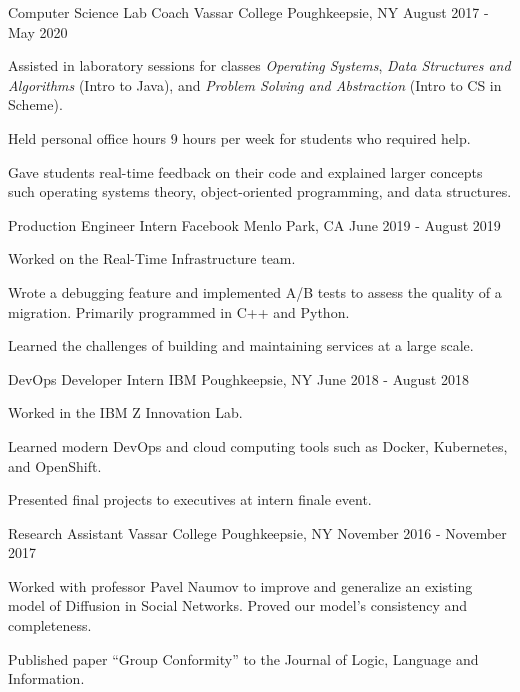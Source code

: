 \begin{cventries}
   \cventry
    {Computer Science Lab Coach}
    {Vassar College}
    {Poughkeepsie, NY}
    {August 2017 - May 2020}
    {
        \begin{cvitems}
        \item {Assisted in laboratory sessions for classes \textit{Operating Systems}, \textit{Data Structures and Algorithms} (Intro to Java), and \textit{Problem Solving and Abstraction} (Intro to CS in Scheme).}        
        \item {Held personal office hours 9 hours per week for students who required help.}
        \item {Gave students real-time feedback on their code and explained larger concepts such operating systems theory, object-oriented programming, and data structures.}
        \end{cvitems}
    }
  \cventry
    {Production Engineer Intern} %
    {Facebook} %
    {Menlo Park, CA} %
    {June 2019 - August 2019} %
    {
      \begin{cvitems} %
      \item {Worked on the Real-Time Infrastructure team.}
      \item {Wrote a debugging feature and implemented A/B tests to assess the quality of a migration. Primarily programmed in C++ and Python.} 
      \item {Learned the challenges of building and maintaining services at a large scale.}
      \end{cvitems}
    }

  \cventry
    {DevOps Developer Intern} %
    {IBM} %
    {Poughkeepsie, NY} %
    {June 2018 - August 2018} %
    {
      \begin{cvitems} %
      \item {Worked in the IBM Z Innovation Lab.}
        \item {Learned modern DevOps and cloud computing tools such as Docker, Kubernetes, and OpenShift.}
        \item {Presented final projects to executives at intern finale event.}
      \end{cvitems}
    }

    \cventry
    {Research Assistant}
    {Vassar College}
    {Poughkeepsie, NY}
    {November 2016 - November 2017}
    {
        \begin{cvitems}
        \item{Worked with professor Pavel Naumov to improve and generalize an existing model of Diffusion in Social Networks. Proved our model’s consistency and completeness.}
        \item{Published paper “Group Conformity” to the Journal of Logic, Language and Information.} 
        \end{cvitems}
        }

\end{cventries}
